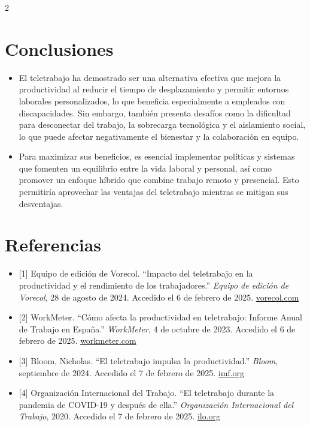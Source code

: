 \documentclass[12pt,spanish,Letterpaper,openany]{book}
\providecommand{\tightlist}{%
  \setlength{\itemsep}{0pt}\setlength{\parskip}{0pt}}
\begin{document}
\begin {multicols}{2}
\hypertarget{conclusiones-9}{%
\section{Conclusiones}\label{conclusiones-9}}

\begin{itemize}
\tightlist
\item
  El teletrabajo ha demostrado ser una alternativa efectiva que mejora la productividad
  al reducir el tiempo de desplazamiento y permitir entornos laborales personalizados,
  lo que beneficia especialmente a empleados con discapacidades. Sin embargo,
  también presenta desafíos como la dificultad para desconectar del trabajo, la
  sobrecarga tecnológica y el aislamiento social, lo que puede afectar negativamente el
  bienestar y la colaboración en equipo.
\item
  Para maximizar sus beneficios, es esencial implementar políticas y sistemas que
  fomenten un equilibrio entre la vida laboral y personal, así como promover un
  enfoque híbrido que combine trabajo remoto y presencial. Esto permitiría aprovechar
  las ventajas del teletrabajo mientras se mitigan sus desventajas.
\end{itemize}

\hypertarget{referencias-9}{%
\section{Referencias}\label{referencias-9}}

\begin{itemize}
\item
  {[}1{]} Equipo de edición de Vorecol. ``Impacto del teletrabajo en la productividad y el rendimiento de los trabajadores.'' \emph{Equipo de edición de Vorecol}, 28 de agosto de 2024. Accedido el 6 de febrero de 2025. \href{https://vorecol.com/es/articulos/articulo-impacto-del-teletrabajo-en-la-productividad-y-el-rendimiento-de-los-trabajadores-33172}{vorecol.com}
\item
  {[}2{]} WorkMeter. ``Cómo afecta la productividad en teletrabajo: Informe Anual de Trabajo en España.'' \emph{WorkMeter}, 4 de octubre de 2023. Accedido el 6 de febrero de 2025. \href{https://www.workmeter.com/blog/como-afecta-la-productividad-en-teletrabajo/}{workmeter.com}
\item
  {[}3{]} Bloom, Nicholas. ``El teletrabajo impulsa la productividad.'' \emph{Bloom}, septiembre de 2024. Accedido el 7 de febrero de 2025. \href{https://www.imf.org/es/Publications/fandd/issues/2024/09/working-from-home-is-powering-productivity-bloom}{imf.org}
\item
  {[}4{]} Organización Internacional del Trabajo. ``El teletrabajo durante la pandemia de COVID-19 y después de ella.'' \emph{Organización Internacional del Trabajo}, 2020. Accedido el 7 de febrero de 2025. \href{https://www.ilo.org/sites/default/files/wcmsp5/groups/public/@ed_protect/@protrav/@travail/documents/publication/wcms_758007.pdf}{ilo.org}
\end{itemize}

\end {multicols}
\end{document}
